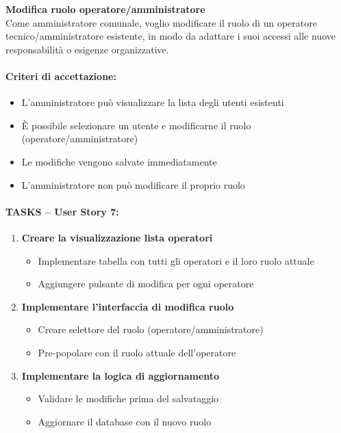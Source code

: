 \textbf{Modifica ruolo operatore/amministratore} \\
Come amministratore comunale, voglio modificare il ruolo di un operatore tecnico/amministratore esistente, in modo da adattare i suoi accessi alle nuove responsabilità o esigenze organizzative.

\paragraph*{Criteri di accettazione:}
\begin{itemize}
    \item L'amministratore può visualizzare la lista degli utenti esistenti
    \item È possibile selezionare un utente e modificarne il ruolo (operatore/amministratore)
    \item Le modifiche vengono salvate immediatamente
    \item L'amministratore non può modificare il proprio ruolo
\end{itemize}

\paragraph*{TASKS – User Story 7:}
\begin{enumerate}
    \item \textbf{Creare la visualizzazione lista operatori}
    \begin{itemize}
        \item Implementare tabella con tutti gli operatori e il loro ruolo attuale
        \item Aggiungere pulsante di modifica per ogni operatore
    \end{itemize}
    \item \textbf{Implementare l'interfaccia di modifica ruolo}
    \begin{itemize}
        \item Creare selettore del ruolo (operatore/amministratore)
        \item Pre-popolare con il ruolo attuale dell'operatore
    \end{itemize}
    \item \textbf{Implementare la logica di aggiornamento}
    \begin{itemize}
        \item Validare le modifiche prima del salvataggio
        \item Aggiornare il database con il nuovo ruolo
    \end{itemize}
\end{enumerate}


